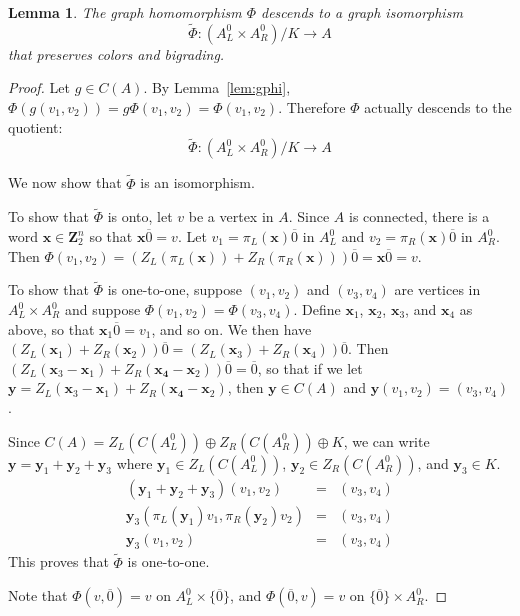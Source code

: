\documentclass[12pt,twoside,singlespace]{article}
\numberwithin{equation}{section}
\newtheorem{lem}[equation]{Lemma}
\theoremstyle{definition}
\newcommand{\ZZ}{\mathbf{Z}}
\renewcommand{\vec}[1]{\mathbf{#1}}
\begin{document}
\begin{lem}
\label{lem:mainiso}
The graph homomorphism $\Phi$ descends to a graph isomorphism
\[\tilde{\Phi}:(A_L^0\times A_R^0)/K \to A\]
that preserves colors and bigrading.
\end{lem}
\begin{proof}
Let $g\in C(A)$.  By Lemma~\ref{lem:gphi}, $\Phi(g(v_1,v_2))=g\Phi(v_1,v_2)=\Phi(v_1,v_2)$.  Therefore $\Phi$ actually descends to the quotient:
\[\tilde{\Phi}:(A_L^0\times A_R^0)/K\to A\]

We now show that $\tilde{\Phi}$ is an isomorphism.

To show that $\tilde{\Phi}$ is onto, let $v$ be a vertex in $A$.  Since $A$ is connected, there is a word $\vec{x}\in \ZZ_2^n$ so that $\vec{x}\overline{0}=v$.  Let $v_1=\pi_L(\vec{x})\overline{0}$ in $A_L^0$ and $v_2=\pi_R(\vec{x})\overline{0}$ in $A_R^0$.  Then $\Phi(v_1,v_2)=(Z_L(\pi_L(\vec{x})) + Z_R(\pi_R(\vec{x})))\overline{0} = \vec{x}\overline{0}= v$.

To show that $\tilde{\Phi}$ is one-to-one, suppose $(v_1,v_2)$ and $(v_3,v_4)$ are vertices in $A_L^0\times A_R^0$ and suppose $\Phi(v_1,v_2)=\Phi(v_3,v_4)$.  Define $\vec{x}_1$, $\vec{x}_2$, $\vec{x}_3$, and $\vec{x}_4$ as above, so that $\vec{x}_1\overline{0}=v_1$, and so on.  We then have $(Z_L(\vec{x}_1)+Z_R(\vec{x}_2))\overline{0}=(Z_L(\vec{x}_3) +Z_R(\vec{x}_4))\overline{0}$.  Then $(Z_L(\vec{x}_3-\vec{x}_1)+Z_R(\vec{x_4}-\vec{x}_2))\overline{0}=\overline{0}$, so that if we let $\vec{y}=Z_L(\vec{x}_3-\vec{x}_1)+Z_R(\vec{x_4}-\vec{x}_2)$, then $\vec{y}\in C(A)$ and $\vec{y}(v_1,v_2)=(v_3,v_4)$.

Since $C(A)=Z_L(C(A_L^0))\oplus Z_R(C(A_R^0))\oplus K$, we can write $\vec{y}=\vec{y}_1+\vec{y}_2+\vec{y}_3$ where $\vec{y}_1\in Z_L(C(A_L^0))$, $\vec{y}_2\in Z_R(C(A_R^0))$, and $\vec{y}_3\in K$.
\begin{eqnarray*}
(\vec{y}_1+\vec{y}_2+\vec{y}_3)(v_1,v_2)&=&(v_3,v_4)\\
\vec{y}_3(\pi_L(\vec{y}_1)v_1,\pi_R(\vec{y}_2)v_2)&=&(v_3,v_4)\\
\vec{y}_3(v_1,v_2)&=&(v_3,v_4)
\end{eqnarray*}
This proves that $\tilde{\Phi}$ is one-to-one.


Note that $\Phi(v,\overline{0})=v$ on $A_L^0\times\{\overline{0}\}$, and $\Phi(\overline{0},v)=v$ on $\{\overline{0}\}\times A_R^0$.


\end{proof}
\end{document}
